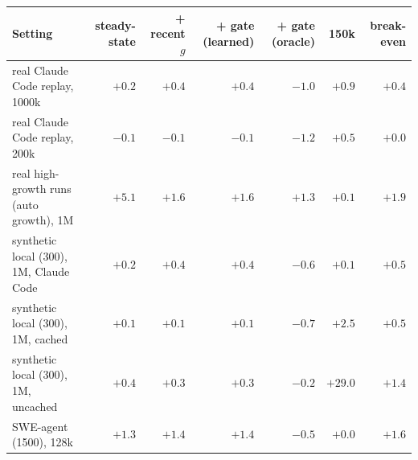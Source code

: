 \begin{tabular}{lrrrrrr}
\toprule
Setting & steady-state & + recent $g$ & + gate (learned) & + gate (oracle) & 150k & break-even\\
\midrule
real Claude Code replay, 1000k & $+0.2$ & $+0.4$ & $+0.4$ & $-1.0$ & $+0.9$ & $+0.4$\\
real Claude Code replay, 200k & $-0.1$ & $-0.1$ & $-0.1$ & $-1.2$ & $+0.5$ & $+0.0$\\
real high-growth runs (auto growth), 1M & $+5.1$ & $+1.6$ & $+1.6$ & $+1.3$ & $+0.1$ & $+1.9$\\
synthetic local (300), 1M, Claude Code & $+0.2$ & $+0.4$ & $+0.4$ & $-0.6$ & $+0.1$ & $+0.5$\\
synthetic local (300), 1M, cached & $+0.1$ & $+0.1$ & $+0.1$ & $-0.7$ & $+2.5$ & $+0.5$\\
synthetic local (300), 1M, uncached & $+0.4$ & $+0.3$ & $+0.3$ & $-0.2$ & $+29.0$ & $+1.4$\\
SWE-agent (1500), 128k & $+1.3$ & $+1.4$ & $+1.4$ & $-0.5$ & $+0.0$ & $+1.6$\\
\bottomrule
\end{tabular}
